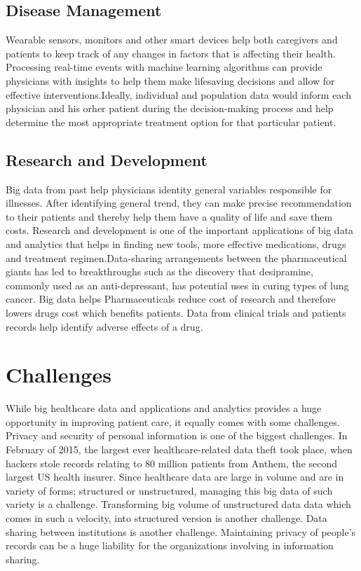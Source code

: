 \documentclass[sigconf]{acmart}
\begin{document}
\subsection{Disease Management} 
Wearable sensors, monitors and other smart devices help both caregivers and patients to keep track of any changes in factors 
that is affecting their health. Processing real-time events with machine learning algorithms can provide physicians with insights 
to help them make lifesaving decisions and allow for effective interventions\cite{www-mapr-com}.Ideally, individual and population 
data would inform each physician and his orher patient during the decision-making process and help determine the most 
appropriate treatment option for that particular patient\cite{www-link-springer-com}. 



\subsection{Research and Development}
Big data from past help physicians identity general variables responsible for illnesses. After identifying general trend, 
they can make precise recommendation to their patients and thereby help them have a quality of life and save them costs. 
Research and development is one of the important applications of big data and
analytics that helps in finding new tools, more effective medications, drugs 
and treatment regimen.Data-sharing arrangements between the pharmaceutical giants has led to breakthroughs such as the discovery 
that desipramine, commonly used as an anti-depressant, has potential uses in curing types of lung cancer\cite{www-forbes-com}. 
Big data helps Pharmaceuticals reduce cost of research and therefore lowers drugs cost which benefits patients. Data from 
clinical trials and patients records help identify adverse effects of a drug.
 
 




\section{Challenges}
While big healthcare data and applications and analytics provides a huge opportunity in improving patient care, it equally 
comes with some challenges. 
Privacy and security of personal information is one of the biggest challenges.
In February of 2015, the largest ever healthcare-related data theft took place, when hackers stole records relating to 80
million patients 
from Anthem, the second largest US health insurer\cite{www-forbes-com}.
Since healthcare data are large in volume and are in variety of forms; structured or unstructured, managing this big data of 
such variety is a challenge. Transforming big volume of unstructured data data which comes in such a velocity, into structured
version is another challenge. Data sharing between institutions is another challenge. Maintaining privacy of people's records 
can be a huge liability for the organizations involving in information sharing.
\end{document}
